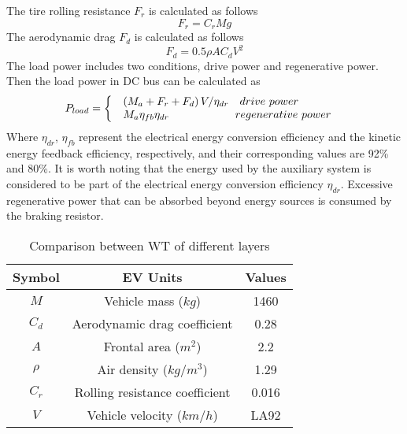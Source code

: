 \documentclass[energies,article,submit,moreauthors,pdftex,10pt,a4paper]{Definitions/mdpi}
\begin{document}
The tire rolling resistance ${F_r}$ is calculated as follows
\begin{equation}
{F_r} = {C_r}Mg
\end{equation}
The aerodynamic drag ${F_d}$ is calculated as follows
\begin{equation}
{F_d} = 0.5\rho A{C_d}{V^2}
\end{equation}
The load power includes two conditions, drive power and regenerative power. Then the load power in DC bus can be calculated as
\begin{equation}
{P_{load}} = \left\{ \begin{array}{l}
\begin{array}{*{20}{c}}
{\left( {{M_a} + {F_r} + {F_d}} \right)V/{\eta _{dr}}}&{{\rm{ }}drive{\rm{ \ }}power}
\end{array}\\
\begin{array}{*{20}{c}}
{{M_a}{\eta _{fb}}{\eta _{dr}}}&{{\rm{ \qquad \qquad \quad }}regenerative{\rm{  \   }}power}
\end{array}
\end{array} \right.
\end{equation}
Where ${\eta _{dr}}$, ${\eta _{fb}}$ represent the electrical energy conversion efficiency and the kinetic energy feedback efficiency, respectively, and their corresponding values are 92\% and 80\%.  
It is worth noting that the energy used by the auxiliary system is considered to be part of the electrical energy conversion efficiency ${\eta _{dr}}$. Excessive regenerative power that can be absorbed beyond energy sources is consumed by the braking resistor.

\begin{table*}[ht]
\begin{center}
\caption{Comparison between WT of different layers}\label{EV}
\begin{tabular}{ccc}
\toprule  %
Symbol & EV Units & Values\\
\midrule  %
$M$ & Vehicle mass ($kg$) &1460 \\
${C_d}$&Aerodynamic drag coefficient &0.28 \\
$A$ &  Frontal area (${m^2}$) &2.2 \\
$\rho$ & Air density (${{kg}/m^3}$) &1.29 \\
${C_r}$& Rolling resistance coefficient &0.016 \\
$V$& Vehicle velocity  (${{km}/h}$)& LA92 \\
\bottomrule %
\end{tabular}
\end{center}
\end{table*}
\end{document}
